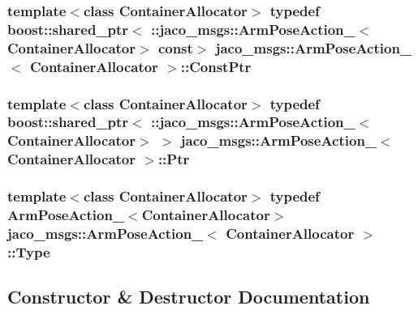 \subsubsection[{\texorpdfstring{Const\+Ptr}{ConstPtr}}]{\setlength{\rightskip}{0pt plus 5cm}template$<$class Container\+Allocator$>$ typedef boost\+::shared\+\_\+ptr$<$ \+::{\bf jaco\+\_\+msgs\+::\+Arm\+Pose\+Action\+\_\+}$<$Container\+Allocator$>$ const$>$ {\bf jaco\+\_\+msgs\+::\+Arm\+Pose\+Action\+\_\+}$<$ Container\+Allocator $>$\+::{\bf Const\+Ptr}}\hypertarget{structjaco__msgs_1_1ArmPoseAction___a080bee6761560402dc95addde884c201}{}\label{structjaco__msgs_1_1ArmPoseAction___a080bee6761560402dc95addde884c201}
\subsubsection[{\texorpdfstring{Ptr}{Ptr}}]{\setlength{\rightskip}{0pt plus 5cm}template$<$class Container\+Allocator$>$ typedef boost\+::shared\+\_\+ptr$<$ \+::{\bf jaco\+\_\+msgs\+::\+Arm\+Pose\+Action\+\_\+}$<$Container\+Allocator$>$ $>$ {\bf jaco\+\_\+msgs\+::\+Arm\+Pose\+Action\+\_\+}$<$ Container\+Allocator $>$\+::{\bf Ptr}}\hypertarget{structjaco__msgs_1_1ArmPoseAction___a299629f21b494de927b8b2beda572a8b}{}\label{structjaco__msgs_1_1ArmPoseAction___a299629f21b494de927b8b2beda572a8b}
\subsubsection[{\texorpdfstring{Type}{Type}}]{\setlength{\rightskip}{0pt plus 5cm}template$<$class Container\+Allocator$>$ typedef {\bf Arm\+Pose\+Action\+\_\+}$<$Container\+Allocator$>$ {\bf jaco\+\_\+msgs\+::\+Arm\+Pose\+Action\+\_\+}$<$ Container\+Allocator $>$\+::{\bf Type}}\hypertarget{structjaco__msgs_1_1ArmPoseAction___a7026e3c2bde54aceca4d9b54e1d76dd6}{}\label{structjaco__msgs_1_1ArmPoseAction___a7026e3c2bde54aceca4d9b54e1d76dd6}


\subsection{Constructor \& Destructor Documentation}
